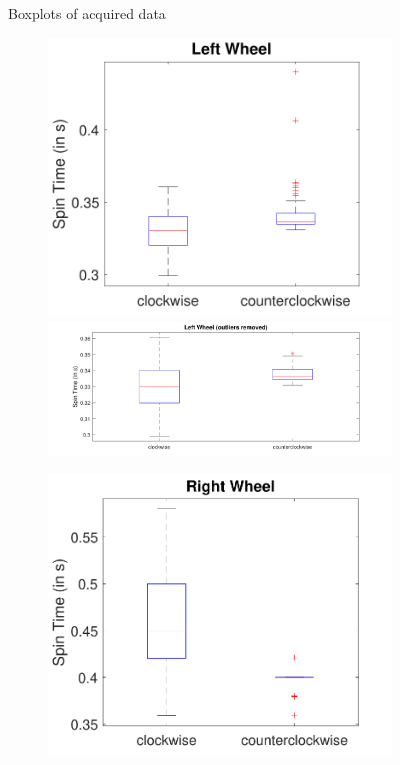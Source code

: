 \documentclass[a4paper,twoside]{book}
\begin{document}
\begin{description}
\begin{figure}[h]
  \caption{Boxplots of acquired data}
\end{figure}

\begin{figure}[h]
  \begin{subfigure}[t]{0.4\textwidth}
  \includegraphics[width=\textwidth, center]{img/left}\\[1cm]
  \includegraphics[width=\textwidth, center]{img/left2}
  \end{subfigure}
  \quad
  \begin{subfigure}[t]{0.4\textwidth} 
  \includegraphics[width=\textwidth, center]{img/right}\\[1cm]

\end{subfigure}
\end{figure}
\end{description}
\end{document}
